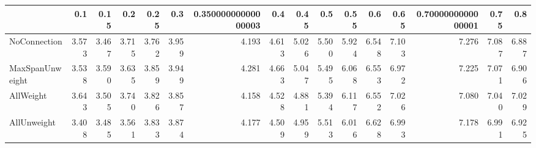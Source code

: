 \begin{tabular}{lrrrrrrrrrrrrrrr}
\toprule
{} &   0.1 &  0.15 &   0.2 &  0.25 &   0.3 & 0.35000000000000003 &   0.4 &  0.45 &   0.5 &  0.55 &   0.6 &  0.65 & 0.7000000000000001 &  0.75 &   0.8 \\
\midrule
NoConnection    & 3.573 & 3.467 & 3.715 & 3.762 & 3.959 &               4.193 & 4.613 & 5.026 & 5.500 & 5.924 & 6.548 & 7.103 &              7.276 & 7.087 & 6.887 \\
MaxSpanUnweight & 3.538 & 3.590 & 3.635 & 3.859 & 3.949 &               4.281 & 4.663 & 5.047 & 5.495 & 6.068 & 6.553 & 6.972 &              7.225 & 7.071 & 6.906 \\
AllWeight       & 3.643 & 3.505 & 3.740 & 3.826 & 3.857 &               4.158 & 4.528 & 4.881 & 5.394 & 6.117 & 6.552 & 7.026 &              7.080 & 7.040 & 7.029 \\
AllUnweight     & 3.408 & 3.485 & 3.561 & 3.833 & 3.874 &               4.177 & 4.509 & 4.959 & 5.513 & 6.016 & 6.628 & 6.993 &              7.178 & 6.991 & 6.925 \\
\bottomrule
\end{tabular}
